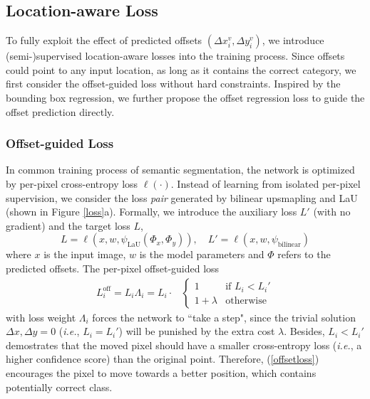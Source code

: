 \documentclass[10pt,twocolumn,letterpaper]{article}
\begin{document}
\subsection{Location-aware Loss}
To fully exploit the effect of predicted offsets $(\Delta x_i^v,\Delta y_i^v)$, we introduce (semi-)supervised location-aware losses into the training process. Since offsets could point to any input location, as long as it contains the correct category, we first consider the offset-guided loss without hard constraints. Inspired by the bounding box regression, we further propose the offset regression loss to guide the offset prediction directly. 

\subsubsection{Offset-guided Loss}
In common training process of semantic segmentation, the network is optimized by per-pixel cross-entropy loss $\ell(\cdot)$. Instead of learning from isolated per-pixel supervision, we consider the  loss \textit{pair} generated by bilinear upsmapling and LaU (shown in Figure \ref{loss}a). Formally, we introduce the auxiliary loss $L'$ (with no gradient) and the target loss $L$,
\begin{equation*}
L=\ell(x,w,\psi_{\text{LaU}}(\Phi_x,\Phi_y)),\quad L'=\ell(x,w,\psi_{\text{bilinear}}) 
\end{equation*}
where $x$ is the input image, $w$ is the model parameters and $\Phi$ refers to the predicted offsets. The per-pixel offset-guided loss
\begin{equation}
\begin{aligned}
L^{\text{off}}_i=L_i\Lambda_i=L_i\cdot
&\begin{cases}
1 &\text{if  } L_i<L_i'\\
1+\lambda &\text{otherwise}
\end{cases}
\end{aligned}
\label{offsetloss}
\end{equation}
with loss weight $\Lambda_i$ forces the network to ``take a step", since the trivial solution $\Delta x,\Delta y=0$ (\textit{i.e.}, $L_i=L_i'$) will be punished by the extra cost $\lambda$. Besides, $L_i<L_i'$ demostrates that the moved pixel should have a smaller cross-entropy loss (\textit{i.e.}, a higher confidence score) than the original point. Therefore,  (\ref{offsetloss}) encourages the pixel to move towards a better position, which contains potentially correct class.  
\end{document}
